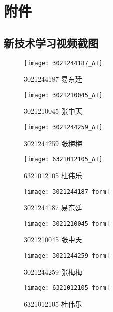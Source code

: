 \chapter{附件}
\section{新技术学习视频截图}

\begin{figure}[htbp]
    \centering
    \texttt{[image: 3021244187\_AI]}
    \caption{3021244187 易东廷}\label{fig:3021244187_AI}
    \vspace{\baselineskip}
\end{figure}
\begin{figure}[htbp]
    \centering
    \texttt{[image: 3021210045\_AI]}
    \caption{3021210045 张中天}\label{fig:3021210045_AI}
    \vspace{\baselineskip}
\end{figure}
\begin{figure}[htbp]
    \centering
    \texttt{[image: 3021244259\_AI]}
    \caption{3021244259 张梅梅}\label{fig:3021244259_AI}
    \vspace{\baselineskip}
\end{figure}
\begin{figure}[htbp]
    \centering
    \texttt{[image: 6321012105\_AI]}
    \caption{6321012105 杜伟乐}\label{fig:6321012105_AI}
    \vspace{\baselineskip}
\end{figure}

\begin{figure}[htbp]
    \centering
    \begin{minipage}{0.4\textwidth}
        \centering
        \texttt{[image: 3021244187\_form]}
        \caption{3021244187 易东廷}\label{fig:3021244187_form}
    \end{minipage}
    \begin{minipage}{0.4\textwidth}
        \centering
        \texttt{[image: 3021210045\_form]}
        \caption{3021210045 张中天}\label{fig:3021210045_form}
    \end{minipage}
\end{figure}
\begin{figure}[htbp]
    \centering
    \begin{minipage}{0.4\textwidth}
        \centering
        \texttt{[image: 3021244259\_form]}
        \caption{3021244259 张梅梅}\label{fig:3021244259_form}
    \end{minipage}
    \begin{minipage}{0.4\textwidth}
        \centering
        \texttt{[image: 6321012105\_form]}
        \caption{6321012105 杜伟乐}\label{fig:6321012105_form}
    \end{minipage}
\end{figure}
